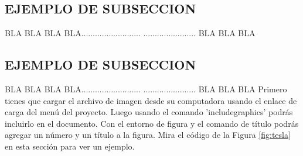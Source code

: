 \documentclass[12pt,a4paper]{report}
\begin{document}
\subsection{EJEMPLO DE SUBSECCION}
BLA BLA BLA BLA..........................
....................... BLA BLA BLA
\subsection{EJEMPLO DE SUBSECCION}
BLA BLA BLA BLA..........................
....................... BLA BLA BLA
Primero tienes que cargar el archivo de imagen desde su computadora usando el enlace de carga del menú del proyecto. Luego usando el comando 'includegraphics' podrás incluirlo en el documento. Con el entorno de figura y el comando de título podrás agregar un número y un título a la figura. Mira el código de la Figura \ref{fig:tesla} en esta sección para ver un ejemplo.
\end{document}
